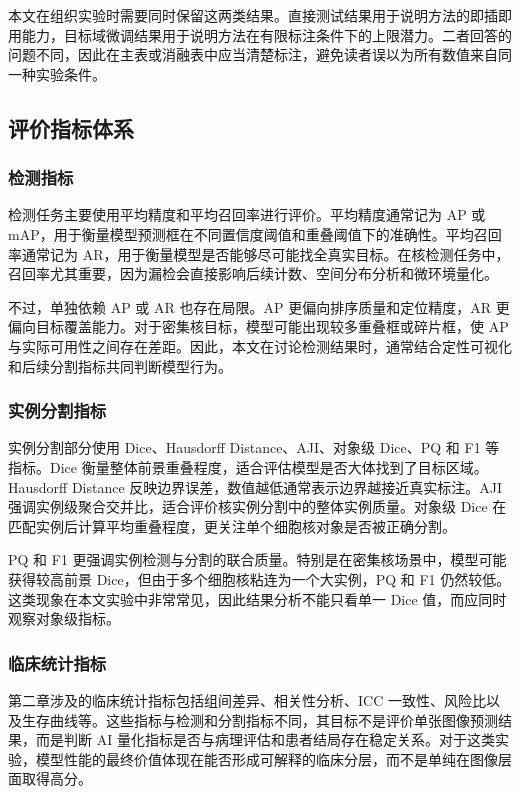 本文在组织实验时需要同时保留这两类结果。直接测试结果用于说明方法的即插即用能力，目标域微调结果用于说明方法在有限标注条件下的上限潜力。二者回答的问题不同，因此在主表或消融表中应当清楚标注，避免读者误以为所有数值来自同一种实验条件。

\subsection{评价指标体系}
\subsubsection{检测指标}
检测任务主要使用平均精度和平均召回率进行评价。平均精度通常记为 AP 或 mAP，用于衡量模型预测框在不同置信度阈值和重叠阈值下的准确性。平均召回率通常记为 AR，用于衡量模型是否能够尽可能找全真实目标。在核检测任务中，召回率尤其重要，因为漏检会直接影响后续计数、空间分布分析和微环境量化。

不过，单独依赖 AP 或 AR 也存在局限。AP 更偏向排序质量和定位精度，AR 更偏向目标覆盖能力。对于密集核目标，模型可能出现较多重叠框或碎片框，使 AP 与实际可用性之间存在差距。因此，本文在讨论检测结果时，通常结合定性可视化和后续分割指标共同判断模型行为。

\subsubsection{实例分割指标}
实例分割部分使用 Dice、Hausdorff Distance、AJI、对象级 Dice、PQ 和 F1 等指标。Dice 衡量整体前景重叠程度，适合评估模型是否大体找到了目标区域。Hausdorff Distance 反映边界误差，数值越低通常表示边界越接近真实标注。AJI 强调实例级聚合交并比，适合评价核实例分割中的整体实例质量。对象级 Dice 在匹配实例后计算平均重叠程度，更关注单个细胞核对象是否被正确分割。

PQ 和 F1 更强调实例检测与分割的联合质量。特别是在密集核场景中，模型可能获得较高前景 Dice，但由于多个细胞核粘连为一个大实例，PQ 和 F1 仍然较低。这类现象在本文实验中非常常见，因此结果分析不能只看单一 Dice 值，而应同时观察对象级指标。

\subsubsection{临床统计指标}
第二章涉及的临床统计指标包括组间差异、相关性分析、ICC 一致性、风险比以及生存曲线等。这些指标与检测和分割指标不同，其目标不是评价单张图像预测结果，而是判断 AI 量化指标是否与病理评估和患者结局存在稳定关系。对于这类实验，模型性能的最终价值体现在能否形成可解释的临床分层，而不是单纯在图像层面取得高分。

